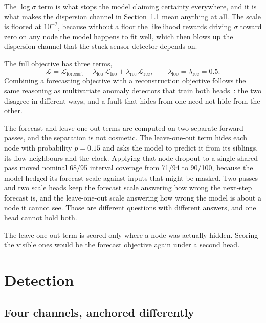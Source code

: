 \documentclass{article}
\begin{document}
The $\log \sigma$ term is what stops the model claiming certainty everywhere,
and it is what makes the dispersion channel in Section~\ref{sec:channels} mean
anything at all. The scale is floored at $10^{-2}$, because without a floor the
likelihood rewards driving $\sigma$ toward zero on any node the model happens
to fit well, which then blows up the dispersion channel that the stuck-sensor
detector depends on.

The full objective has three terms,
\begin{equation}
  \mathcal{L} = \mathcal{L}_{\mathrm{forecast}}
              + \lambda_{\mathrm{loo}} \, \mathcal{L}_{\mathrm{loo}}
              + \lambda_{\mathrm{rec}} \, \mathcal{L}_{\mathrm{rec}},
  \qquad \lambda_{\mathrm{loo}} = \lambda_{\mathrm{rec}} = 0.5 .
\end{equation}
Combining a forecasting objective with a reconstruction objective follows the
same reasoning as multivariate anomaly detectors that train both
heads~\citep{zhao2020mtadgat}: the two disagree in different ways, and a fault
that hides from one need not hide from the other.

The forecast and leave-one-out terms are computed on two separate forward
passes, and the separation is not cosmetic. The leave-one-out term hides each
node with probability $p = 0.15$ and asks the model to predict it from its
siblings, its flow neighbours and the clock. Applying that node dropout to a
single shared pass moved nominal 68/95 interval coverage from 71/94 to 90/100,
because the model hedged its forecast scale against inputs that might be
masked. Two passes and two scale heads keep the forecast scale answering how
wrong the next-step forecast is, and the leave-one-out scale answering how
wrong the model is about a node it cannot see. Those are different questions
with different answers, and one head cannot hold both.

The leave-one-out term is scored only where a node was actually hidden.
Scoring the visible ones would be the forecast objective again under a second
head.

\section{Detection}
\label{sec:detection}

\subsection{Four channels, anchored differently}
\label{sec:channels}
\end{document}
